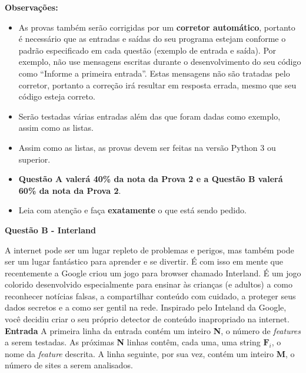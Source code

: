 \documentclass[a4paper, 12pt]{article}
\begin{document}
\textbf{{\large Observações:}}
\begin{itemize}
	\item As provas também serão corrigidas por um \textbf{corretor automático}, portanto é necessário que as entradas e saídas do seu programa estejam conforme o padrão especificado em cada questão (exemplo de entrada e saída). Por exemplo, não use mensagens escritas durante o desenvolvimento do seu código como “Informe a primeira entrada”. Estas mensagens não são tratadas pelo corretor, portanto a correção irá resultar em resposta errada, mesmo que seu código esteja correto.
	\item Serão testadas várias entradas além das que foram dadas como exemplo, assim como as listas.
	\item Assim como as listas, as provas devem ser feitas na versão Python 3 ou superior.
	\item \textbf{Questão A valerá 40\% da nota da Prova 2 e a Questão B valerá 60\% da nota da Prova 2}.
	\item Leia com atenção e faça \textbf{exatamente} o que está sendo pedido.
\end{itemize}
\newpage %
\begin{center}
\textbf{{\Large Questão B - Interland}}
\end{center}
\vspace{5pt}
A internet pode ser um lugar repleto de problemas e perigos, mas também pode
ser um lugar fantástico para aprender e se divertir. \newline
É com isso em mente que recentemente a Google criou um jogo para browser
chamado Interland. É um jogo colorido desenvolvido especialmente para ensinar
às crianças (e adultos) a como reconhecer notícias falsas, a compartilhar conteúdo
com cuidado, a proteger seus dados secretos e a como ser gentil na rede.
Inspirado pelo Inteland da Google, você decidiu criar o seu próprio detector de
conteúdo inapropriado na internet. \newline \newline
\textbf{{\large Entrada}} \newline
A primeira linha da entrada contém um inteiro \textbf{N}, o número de \textit{features} a serem
testadas. \newline
As próximas \textbf{N} linhas contêm, cada uma, uma string $\textbf{F}_i$, o nome da \textit{feature} descrita. \newline
A linha seguinte, por sua vez, contém um inteiro \textbf{M}, o número de sites a serem
analisados. \newline
\end{document}
